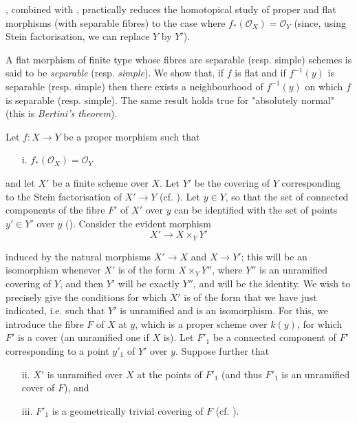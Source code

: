 , combined with , practically reduces the homotopical study of proper and flat morphisms (with separable fibres) to the case where $f_*(\mathcal{O}_X)=\mathcal{O}_Y$ (since, using Stein factorisation, we can replace $Y$ by $Y'$).


\begin{remark}\label{fga2-8-remark}
    A flat morphism of finite type whose fibres are separable (resp. simple) schemes is said to be \emph{separable} (resp. \emph{simple}).
    We show that, if $f$ is flat and if $f^{-1}(y)$ is separable (resp. simple) then there exists a neighbourhood of $f^{-1}(y)$ on which $f$ is separable (resp. simple).
    The same result holds true for "absolutely normal" (this is \emph{Bertini's theorem}).
\end{remark}



Let $f\colon X\to Y$ be a proper morphism such that

\begin{enumerate}
    \item[i.] $f_*(\mathcal{O}_X) = \mathcal{O}_Y$
\end{enumerate}

and let $X'$ be a finite scheme over $X$.
Let $Y'$ be the covering of $Y$ corresponding to the Stein factorisation of $X'\to Y$ (cf. ).
Let $y\in Y$, so that the set of connected components of the fibre $F'$ of $X'$ over $y$ can be identified with the set of points $y'\in Y'$ over $y$ ().
Consider the evident morphism
\begin{equation}\label{fga2-equation-star}
    X'\to X\times_Y Y' \tag{*}
\end{equation}

induced by the natural morphisms $X'\to X$ and $X\to Y'$;
this will be an isomorphism whenever $X'$ is of the form $X\times_Y Y''$, where $Y''$ is an unramified covering of $Y$, and then $Y'$ will be exactly $Y''$, and  will be the identity.
We wish to precisely give the conditions for which $X'$ is of the form that we have just indicated, i.e. such that $Y'$ is unramified and  is an isomorphism.
For this, we introduce the fibre $F$ of $X$ at $y$, which is a proper scheme over $k(y)$, for which $F'$ is a cover (an unramified one if $X$ is).
Let $F'_1$ be a connected component of $F'$ corresponding to a point $y'_1$ of $Y'$ over $y$.
Suppose further that

\begin{enumerate}
    \item[ii.] $X'$ is unramified over $X$ at the points of $F'_1$ (and thus $F'_1$ is an unramified cover of $F$), and
    \item[iii.] $F'_1$ is a geometrically trivial covering of $F$ (cf. ).
\end{enumerate}


